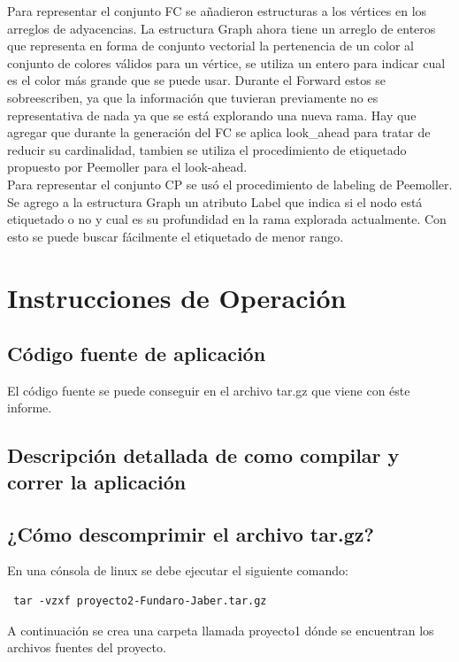 \documentclass[a4paper,10pt]{article}
\begin{document}
\indent Para representar el conjunto FC se a\~nadieron estructuras a los
v\'ertices en los arreglos de adyacencias. La estructura Graph ahora
tiene un arreglo de enteros que representa en forma de conjunto
vectorial la pertenencia de un color al conjunto de colores v\'alidos
para un v\'ertice, se utiliza un entero para indicar cual es el color
m\'as grande que se puede usar. Durante el Forward estos se sobreescriben, ya que la
informaci\'on que tuvieran previamente no es representativa de nada ya
que se est\'a explorando una nueva rama. Hay que agregar que durante la
generaci\'on del FC se aplica look_ahead para tratar de reducir su
cardinalidad, tambien se utiliza el procedimiento de etiquetado
propuesto por Peemoller para el look-ahead.\\

\indent Para representar el conjunto CP se us\'o el procedimiento de labeling de
Peemoller. Se agrego a la estructura Graph un atributo Label que indica
si el nodo est\'a etiquetado o no y cual es su profundidad en la rama
explorada actualmente. Con esto se puede buscar f\'acilmente el
etiquetado de menor rango.
\newpage

\section{Instrucciones de Operación}

\subsection{Código fuente de aplicación}
El código fuente se puede conseguir en el archivo tar.gz que viene con
éste informe.

\subsection{Descripción detallada de como compilar y correr la aplicación}

\subsection{¿Cómo descomprimir el archivo tar.gz?}
En una cónsola de linux se debe ejecutar el siguiente comando:
\begin{verbatim}
 tar -vzxf proyecto2-Fundaro-Jaber.tar.gz
\end{verbatim}
A continuación se crea una carpeta llamada proyecto1 dónde se encuentran
los archivos fuentes del proyecto.
\end{document}
